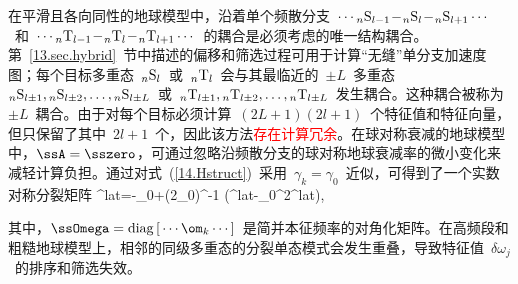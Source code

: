 在平滑且各向同性的地球模型中，沿着单个频散分支~$\cdots{}_n{\rm S}_{l-1}\!-\!{}_n{\rm S}_l\!-\!
{}_n{\rm S}_{l+1}\cdots$~和~$\cdots{}_n{\rm T}_{l-1}\!-\!{}_n{\rm T}_l\!-\!
{}_n{\rm T}_{l+1}\cdots$~的耦合是必须考虑的唯一结构耦合。第~\ref{13.sec.hybrid}~节中描述的偏移和筛选过程可用于计算“无缝”单分支加速度图；每个目标多重态~${}_n{\rm S}_l$~或~${}_n{\rm T}_l$~会与其最临近的~$\pm L$~多重态~${}_n{\rm S}_{l\pm 1},{}_n{\rm S}_{l\pm 2},
\ldots,{}_n{\rm S}_{l\pm L}$~或~${}_n{\rm T}_{l\pm 1},{}_n{\rm T}_{l\pm 2},
\ldots,{}_n{\rm T}_{l\pm L}$~发生耦合。这种耦合被称为~$\pm L$~耦合。由于对每个目标必须计算~$(2L+1)(2l+1)$~个特征值和特征向量，但只保留了其中~$2l+1$~个，因此该方法\textcolor{red}{存在计算冗余}。在球对称衰减的地球模型中，$\ssA=\sszero$，可通过忽略沿频散分支的球对称地球衰减率的微小变化来减轻计算负担。通过对式~(\ref{14.Hstruct})~采用~$\gamma_k=\gamma_0$~近似，可得到了一个实数对称分裂矩阵
\eq \label{14.realHst}
\ssH^{\rm lat}=\ssOmega-\om_0\ssI+(2\om_0)^{-1}
(\ssV^{\rm lat}-\om_0^2\ssT^{\rm lat}),
\en

其中，$\ssOmega={\rm diag}\,[\,\cdots\om_k\cdots\,]$~是简并本征频率的对角化矩阵。在高频段和粗糙地球模型上，相邻的同级多重态的分裂单态模式会发生重叠，导致特征值~$\delta\omega_j$~的排序和筛选失效。

